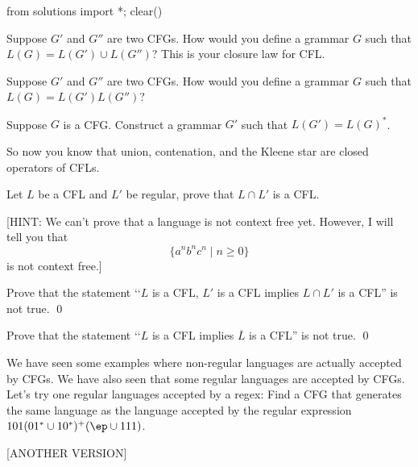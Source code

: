 \begin{python0}
from solutions import *; clear()
\end{python0}

\begin{ex}
Suppose $G'$ and $G''$ are two CFGs.
How would you define a grammar $G$ such that $L(G) = L(G') \cup L(G'')$?
This is your closure law for CFL.
\end{ex}

\newpage
\begin{ex}
Suppose $G'$ and $G''$ are two CFGs.
How would you define a grammar $G$ such that $L(G) = L(G') L(G'')$?
\end{ex}

\newpage
\begin{ex}
Suppose $G$ is a CFG.
Construct a grammar $G'$ such that $L(G') = L(G)^*$. 
\end{ex}

\newpage
So now you know that union, contenation, and the Kleene star are closed 
operators of CFLs.

\newpage
\begin{ex}
Let $L$ be a CFL and $L'$ be regular, prove that $L \cap L'$ is a CFL.
\end{ex}

[HINT: We can't prove that a language is not context free yet.
However, I will tell you that 
\[
\{a^n b^n c^n \mid n \geq 0\}
\]
is not context free.]

\newpage
\begin{ex}
Prove that the statement \lq\lq $L$ is a CFL, $L'$ is a  CFL implies
$L \cap L'$ is a CFL'' is not true.
\qed
\end{ex}

\newpage
\begin{ex}
Prove that the statement \lq\lq $L$ is a CFL implies
$\overline{L}$ is a CFL'' is not true.
\qed
\end{ex}

\newpage
\begin{ex}
We have seen some examples where non-regular languages are actually accepted
by CFGs.
We have also seen that some regular languages are accepted by CFGs.
Let's try one regular languages accepted by a regex:
Find a CFG that generates the same language as the language accepted by 
the regular expression $101(01^* \cup 10^*)^+(\ep \cup 111)$.
\end{ex}

[ANOTHER VERSION]



